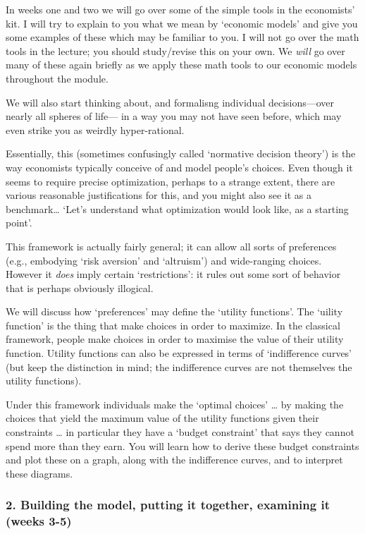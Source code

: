 \documentclass[]{article}
\begin{document}
In weeks one and two we will go over some of the simple tools in the
economists' kit. I will try to explain to you what we mean by `economic
models' and give you some examples of these which may be familiar to
you. I will not go over the math tools in the lecture; you should
study/revise this on your own. We \emph{will} go over many of these
again briefly as we apply these math tools to our economic models
throughout the module.

We will also start thinking about, and formalisng individual
decisions---over nearly all spheres of life--- in a way you may not have
seen before, which may even strike you as weirdly hyper-rational.

Essentially, this (sometimes confusingly called `normative decision
theory') is the way economists typically conceive of and model people's
choices. Even though it seems to require precise optimization, perhaps
to a strange extent, there are various reasonable justifications for
this, and you might also see it as a benchmark\ldots{} `Let's understand
what optimization would look like, as a starting point'.

This framework is actually fairly general; it can allow all sorts of
preferences (e.g., embodying `risk aversion' and `altruism') and
wide-ranging choices. However it \emph{does} imply certain
`restrictions': it rules out some sort of behavior that is perhaps
obviously illogical.

We will discuss how `preferences' may define the `utility functions'.
The `uility function' is the thing that make choices in order to
maximize. In the classical framework, people make choices in order to
maximise the value of their utility function. Utility functions can also
be expressed in terms of `indifference curves' (but keep the distinction
in mind; the indifference curves are not themselves the utility
functions).

Under this framework individuals make the `optimal choices' \ldots{} by
making the choices that yield the maximum value of the utility functions
given their constraints \ldots{} in particular they have a `budget
constraint' that says they cannot spend more than they earn. You will
learn how to derive these budget constraints and plot these on a graph,
along with the indifference curves, and to interpret these diagrams.

\medskip

\hypertarget{building-the-model-putting-it-together-examining-it-weeks-3-5}{%
\subsubsection{2. Building the model, putting it together, examining it
(weeks
3-5)}\label{building-the-model-putting-it-together-examining-it-weeks-3-5}}
\end{document}
